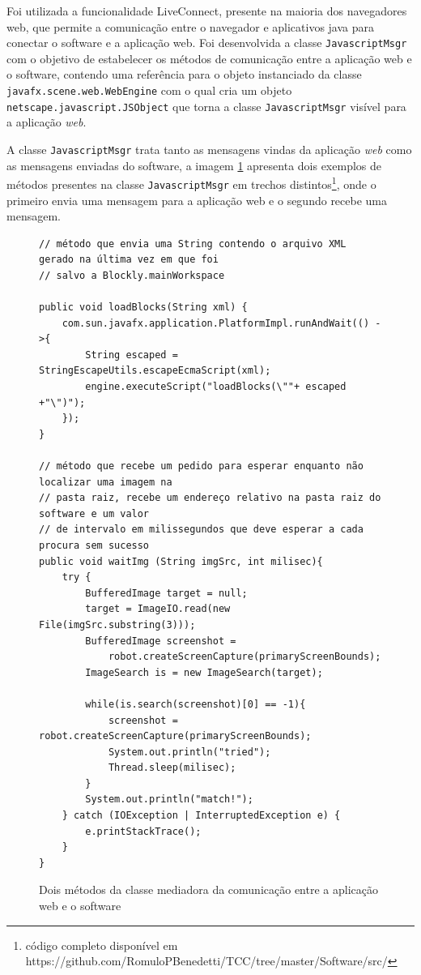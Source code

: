 \documentclass[tg]{mdtufsm}
\begin{document}
                    Foi utilizada a funcionalidade LiveConnect, presente na maioria dos navegadores web, que permite a comunicação entre o navegador e aplicativos java para conectar o software e a aplicação web. Foi desenvolvida a classe \texttt{JavascriptMsgr} com o objetivo de estabelecer os métodos de comunicação entre a aplicação web e o software, contendo uma referência para o objeto instanciado da classe \texttt{javafx.scene.web.WebEngine} com o qual cria um objeto \texttt{netscape.javascript.JSObject} que torna a classe \texttt{JavascriptMsgr} visível para a aplicação \emph{web}.

                    A classe \texttt{JavascriptMsgr} trata tanto as mensagens vindas da aplicação \emph{web} como as mensagens enviadas do software, a imagem \ref{code:javascriptmsg.java} apresenta dois exemplos de métodos presentes na classe \texttt{JavascriptMsgr} em trechos distintos\footnote{código completo disponível em https://github.com/RomuloPBenedetti/TCC/tree/master/Software/src/}, onde o primeiro envia uma mensagem para a aplicação web e o segundo recebe uma mensagem.


\begin{figure}[!htb]
\begin{lstlisting}
// método que envia uma String contendo o arquivo XML gerado na última vez em que foi
// salvo a Blockly.mainWorkspace

public void loadBlocks(String xml) {
    com.sun.javafx.application.PlatformImpl.runAndWait(() ->{
        String escaped = StringEscapeUtils.escapeEcmaScript(xml);
        engine.executeScript("loadBlocks(\""+ escaped +"\")");
    });
}

// método que recebe um pedido para esperar enquanto não localizar uma imagem na
// pasta raiz, recebe um endereço relativo na pasta raiz do software e um valor
// de intervalo em milissegundos que deve esperar a cada procura sem sucesso
public void waitImg (String imgSrc, int milisec){
    try {
        BufferedImage target = null;
        target = ImageIO.read(new File(imgSrc.substring(3)));
        BufferedImage screenshot =
            robot.createScreenCapture(primaryScreenBounds);
        ImageSearch is = new ImageSearch(target);

        while(is.search(screenshot)[0] == -1){
            screenshot = robot.createScreenCapture(primaryScreenBounds);
            System.out.println("tried");
            Thread.sleep(milisec);
        }
        System.out.println("match!");
    } catch (IOException | InterruptedException e) {
        e.printStackTrace();
    }
}
\end{lstlisting}
    \caption{Dois métodos da classe mediadora da comunicação entre a aplicação web e o software}
	\label{code:javascriptmsg.java}
\end{figure}
\end{document}
